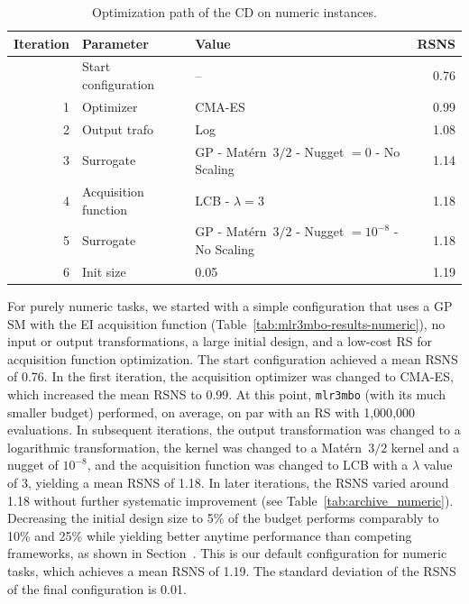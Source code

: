 \documentclass[12pt,letterpaper]{article}
\begin{document}
\begin{table}[ht]
  \centering
  \caption{Optimization path of the CD on numeric instances.}
  \label{tab:optimization-path-numeric}
  \begin{tabular}{rllr}
    \toprule
    Iteration & Parameter            & Value                                             & RSNS \\
    \midrule
              & Start configuration  & --                                                & 0.76 \\
    1         & Optimizer            & CMA-ES                                            & 0.99 \\
    2         & Output trafo         & Log                                               & 1.08 \\
    3         & Surrogate            & GP - Matérn~$3/2$ - Nugget $=0$ - No Scaling         & 1.14 \\
    4         & Acquisition function & LCB - $\lambda=3$                                 & 1.18 \\
    5         & Surrogate            & GP - Matérn~$3/2$ - Nugget $=10^{-8}$ - No Scaling & 1.18 \\
    6         & Init size            & 0.05                                              & 1.19 \\
    \bottomrule
  \end{tabular}
\end{table}

For purely numeric tasks, we started with a simple configuration that uses a GP SM with the EI acquisition function (Table~\ref{tab:mlr3mbo-results-numeric}), no input or output transformations, a large initial design, and a low-cost RS for acquisition function optimization. 
The start configuration achieved a mean RSNS of 0.76.
In the first iteration, the acquisition optimizer was changed to CMA-ES, which increased the mean RSNS to 0.99.
At this point, \texttt{mlr3mbo} (with its much smaller budget) performed, on average, on par with an RS with 1{,}000{,}000 evaluations.
In subsequent iterations, the output transformation was changed to a logarithmic transformation, the kernel was changed to a Matérn~$3/2$ kernel and a nugget of $10^{-8}$, and the acquisition function was changed to LCB with a $\lambda$ value of 3, yielding a mean RSNS of 1.18.
In later iterations, the RSNS varied around 1.18 without further systematic improvement (see Table~\ref{tab:archive_numeric}).
Decreasing the initial design size to 5\% of the budget performs comparably to 10\% and 25\% while yielding better anytime performance than competing frameworks, as shown in Section~.
This is our default configuration for numeric tasks, which achieves a mean RSNS of 1.19.
The standard deviation of the RSNS of the final configuration is 0.01.
\end{document}
